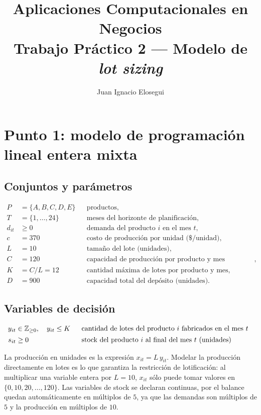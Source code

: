 \documentclass[11pt,a4paper]{article}
\title{Aplicaciones Computacionales en Negocios\\
\large Trabajo Práctico 2 --- Modelo de \emph{lot sizing}}
\author{Juan Ignacio Elosegui}
\date{}
\begin{document}
\maketitle

\section*{Punto 1: modelo de programación lineal entera mixta}

\subsection*{Conjuntos y parámetros}

\begin{align*}
  P &= \{A,B,C,D,E\} && \text{productos,}\\
  T &= \{1,\dots,24\} && \text{meses del horizonte de planificación,}\\
  d_{it} &\ge 0 && \text{demanda del producto } i \text{ en el mes } t,\\
  c &= 370 && \text{costo de producción por unidad (\$/unidad)},\\
  L &= 10 && \text{tamaño del lote (unidades)},\\
  C &= 120 && \text{capacidad de producción por producto y mes (unidades)},\\
  K &= C/L = 12 && \text{cantidad máxima de lotes por producto y mes,}\\
  D &= 900 && \text{capacidad total del depósito (unidades).}
\end{align*}

\subsection*{Variables de decisión}

\begin{align*}
  y_{it} &\in \mathbb{Z}_{\ge 0}, \quad y_{it} \le K
  && \begin{tabular}{l} cantidad de lotes del producto $i$ fabricados en el mes $t$\end{tabular}\\
  s_{it} &\ge 0
  && \begin{tabular}{l} stock del producto $i$ al final del mes $t$ (unidades)\end{tabular}
\end{align*}

La producción en unidades es la expresión $x_{it} = L\,y_{it}$. Modelar la
producción directamente en lotes es lo que garantiza la restricción de
lotificación: al multiplicar una variable entera por $L=10$, $x_{it}$ sólo puede
tomar valores en $\{0,10,20,\dots,120\}$. Las variables de stock se declaran
continuas, por el balance quedan
automáticamente en múltiplos de $5$, ya que las demandas son múltiplos de $5$ y
la producción en múltiplos de $10$.
\end{document}
